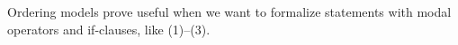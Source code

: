 


Ordering models prove useful when we want to formalize statements with
modal operators and if-clauses, like (1)--(3).

